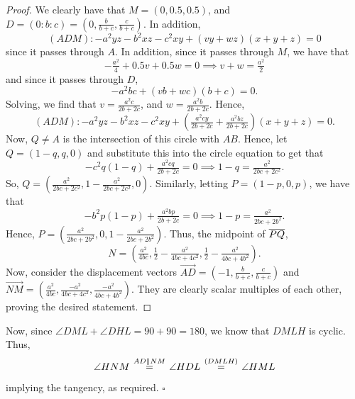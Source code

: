 \documentclass{article}
\begin{document}
\begin{proof}
We clearly have that $M = (0, 0.5, 0.5)$, and $D = (0 : b : c) = \left(0, \tfrac{b}{b+c}, \tfrac{c}{b+c}\right)$. In addition,  \[(ADM) : -a^2yz-b^2xz-c^2xy+(vy+wz)(x+y+z) = 0\] since it passes through $A$. In addition, since it passes through $M$, we have that \[-\tfrac{a^2}{4}+0.5v+0.5w = 0 \implies v+w = \tfrac{a^2}{2}\] and since it passes through $D$, \[-a^2bc+(vb+wc)(b+c) = 0.\] Solving, we find that $v = \tfrac{a^2c}{2b+2c}$, and $w = \tfrac{a^2b}{2b+2c}$. Hence, \[(ADM) : -a^2yz-b^2xz-c^2xy+\left(\tfrac{a^2cy}{2b+2c}+\tfrac{a^2bz}{2b+2c}\right)(x+y+z) = 0.\] Now, $Q \neq A$ is the intersection of this circle with $AB$. Hence, let $Q = (1-q, q, 0)$ and substitute this into the circle equation to get that \[-c^2q(1-q)+\tfrac{a^2cq}{2b+2c} = 0 \implies 1-q = \tfrac{a^2}{2bc+2c^2}.\] So, $Q = \left(\tfrac{a^2}{2bc+2c^2}, 1-\tfrac{a^2}{2bc+2c^2}, 0\right)$. Similarly, letting $P = (1-p, 0, p)$, we have that \[-b^2p(1-p)+\tfrac{a^2bp}{2b+2c} = 0 \implies 1-p = \tfrac{a^2}{2bc+2b^2}.\] Hence, $P = \left(\tfrac{a^2}{2bc+2b^2}, 0, 1-\tfrac{a^2}{2bc+2b^2}\right)$. Thus, the midpoint of $\overline{PQ}$, \[N = \left(\tfrac{a^2}{4bc}, \tfrac{1}{2}-\tfrac{a^2}{4bc+4c^2}, \tfrac{1}{2}-\tfrac{a^2}{4bc+4b^2}\right).\] Now, consider the displacement vectors $\overrightarrow{AD} = \left(-1, \tfrac{b}{b+c}, \tfrac{c}{b+c}\right)$ and $\overrightarrow{NM} = \left(\tfrac{a^2}{4bc}, \tfrac{-a^2}{4bc+4c^2}, \tfrac{-a^2}{4bc+4b^2}\right)$. They are clearly scalar multiples of each other, proving the desired statement.
\end{proof}

Now, since $\angle DML + \angle DHL = 90 + 90 = 180$, we know that $DMLH$ is cyclic. Thus, \[\angle HNM \hspace{0.1em}\stackrel{AD \parallel NM}{=} \hspace{0.1em}\angle HDL \hspace{0.1em}\stackrel{(DMLH)}{=} \hspace{0.1em}\angle HML\] implying the tangency, as required. $\square$
\end{document}
